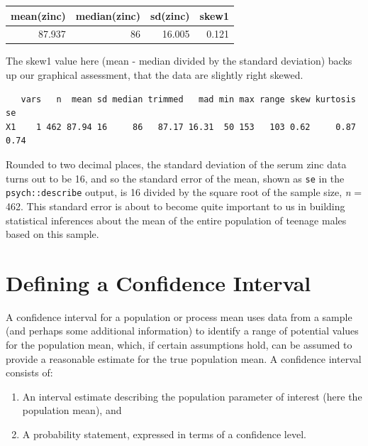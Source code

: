 \documentclass[
]{book}
\newenvironment{Shaded}{\begin{snugshade}}{\end{snugshade}}
\newcommand{\KeywordTok}[1]{\textcolor[rgb]{0.13,0.29,0.53}{\textbf{#1}}}
\newcommand{\NormalTok}[1]{#1}
\newcommand{\OperatorTok}[1]{\textcolor[rgb]{0.81,0.36,0.00}{\textbf{#1}}}
\newcommand{\StringTok}[1]{\textcolor[rgb]{0.31,0.60,0.02}{#1}}
\providecommand{\tightlist}{%
  \setlength{\itemsep}{0pt}\setlength{\parskip}{0pt}}
\begin{document}
\begin{tabular}{r|r|r|r}
\hline
mean(zinc) & median(zinc) & sd(zinc) & skew1\\
\hline
87.937 & 86 & 16.005 & 0.121\\
\hline
\end{tabular}

The skew1 value here (mean - median divided by the standard deviation) backs up our graphical assessment, that the data are slightly right skewed.

\begin{Shaded}
\end{Shaded}

\begin{verbatim}
   vars   n  mean sd median trimmed   mad min max range skew kurtosis   se
X1    1 462 87.94 16     86   87.17 16.31  50 153   103 0.62     0.87 0.74
\end{verbatim}

Rounded to two decimal places, the standard deviation of the serum zinc data turns out to be 16, and so the standard error of the mean, shown as \texttt{se} in the \texttt{psych::describe} output, is 16 divided by the square root of the sample size, \emph{n} = 462. This standard error is about to become quite important to us in building statistical inferences about the mean of the entire population of teenage males based on this sample.

\hypertarget{defining-a-confidence-interval}{%
\section{Defining a Confidence Interval}\label{defining-a-confidence-interval}}

A confidence interval for a population or process mean uses data from a sample (and perhaps some additional information) to identify a range of potential values for the population mean, which, if certain assumptions hold, can be assumed to provide a reasonable estimate for the true population mean. A confidence interval consists of:

\begin{enumerate}
\def\labelenumi{\arabic{enumi}.}
\tightlist
\item
  An interval estimate describing the population parameter of interest (here the population mean), and
\item
  A probability statement, expressed in terms of a confidence level.
\end{enumerate}
\end{document}

